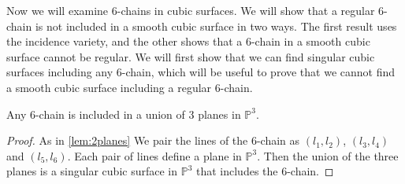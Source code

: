

Now we will examine 6-chains in cubic surfaces. We will show that a regular 6-chain is not included in a smooth cubic surface in two ways. The first result uses the incidence variety, and the other shows that a 6-chain in a smooth cubic surface cannot be regular. We will first show that we can find singular cubic surfaces including any 6-chain, which will be useful to prove that we cannot find a smooth cubic surface including a regular 6-chain.

\begin{lemma}\label{lem:3planes}
    Any 6-chain is included in a union of 3 planes in $\mathbb{P}^3$.
\end{lemma}
\begin{proof}
    As in \cref{lem:2planes} We pair the lines of the 6-chain as $(l_1, l_2)$, $(l_3, l_4)$ and $(l_5, l_6)$. Each pair of lines define a plane in $\mathbb{P}^3$. Then the union of the three planes is a singular cubic surface in $\mathbb{P}^3$ that includes the 6-chain.
\end{proof}

